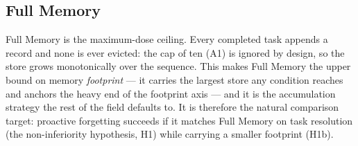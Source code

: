 
\subsection{Full Memory}

Full Memory is the maximum-dose ceiling. Every completed task appends a record and none is
ever evicted: the cap of ten (A1) is ignored by design, so the store grows monotonically
over the sequence. This makes Full Memory the upper bound on memory \emph{footprint} --- it
carries the largest store any condition reaches and anchors the heavy end of the footprint
axis --- and it is the accumulation strategy the rest of the field defaults to. It is
therefore the natural comparison target: proactive forgetting succeeds if it matches Full
Memory on task resolution (the non-inferiority hypothesis, H1) while carrying a smaller
footprint (H1b).
